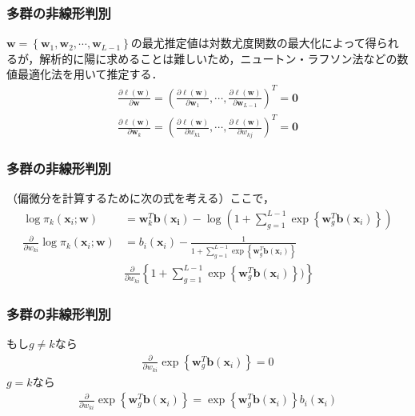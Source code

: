 \documentclass[dvipdfmx,cjk]{beamer}
\theoremstyle{example}
\begin{document}
\begin{frame}
    \frametitle{多群の非線形判別}
    $\boldsymbol{w}=\left\{\boldsymbol{w}_1,\boldsymbol{w}_2,\cdots ,\boldsymbol{w}_{L-1}\right\}$の最尤推定値は対数尤度関数の最大化によって得られるが，解析的に陽に求めることは難しいため，ニュートン・ラフソン法などの数値最適化法を用いて推定する．
    \begin{align*}
        \frac{\partial \ell(\boldsymbol{w})}{\partial \boldsymbol{w}}=(\frac{\partial \ell(\boldsymbol{w})}{\partial \boldsymbol{w}_1},\cdots , \frac{\partial \ell(\boldsymbol{w})}{\partial \boldsymbol{w}_{L-1}})^T=\boldsymbol{0} \\
        \frac{\partial \ell(\boldsymbol{w})}{\partial \boldsymbol{w}_k}=(\frac{\partial \ell(\boldsymbol{w})}{\partial w_{k1}},\cdots ,\frac{\partial \ell(\boldsymbol{w})}{\partial w_{kj}})^T=\boldsymbol{0}
    \end{align*}
\end{frame}

\begin{frame}
    \frametitle{多群の非線形判別}
    （偏微分を計算するために次の式を考える）ここで，
    \begin{align*}
        \log \pi_k(\boldsymbol{x}_i;\boldsymbol{w})                                  & =\boldsymbol{w}_k^T\boldsymbol{b}(\boldsymbol{x_i})-\log(1+\sum\limits_{g=1}^{L-1}\exp\left\{\boldsymbol{w}_g^T\boldsymbol{b}(\boldsymbol{x}_i)\right\}) \\
        \frac{\partial}{\partial w_{ki}} \log \pi_k(\boldsymbol{x}_i;\boldsymbol{w}) & =b_i(\boldsymbol{x}_i)-\frac{1}{1+\sum\limits_{g=1}^{L-1}\exp\left\{\boldsymbol{w}_g^T\boldsymbol{b}(\boldsymbol{x}_i)\right\}}                          \\
                                                                                     & \frac{\partial}{\partial w_{ki}}\left\{1+\sum\limits_{g=1}^{L-1}\exp\left\{\boldsymbol{w}_g^T\boldsymbol{b}(\boldsymbol{x}_i)\right\})\right\}\tag{B}
    \end{align*}
\end{frame}

\begin{frame}
    \frametitle{多群の非線形判別}
    もし$g\neq k$なら
    \begin{align*}
        \frac{\partial}{\partial w_{ki}}\exp\left\{\boldsymbol{w}_g^T\boldsymbol{b}(\boldsymbol{x}_i)\right\}=0
    \end{align*}
    $g=k$なら
    \begin{align*}
        \frac{\partial}{\partial w_{ki}}\exp\left\{\boldsymbol{w}_g^T\boldsymbol{b}(\boldsymbol{x}_i)\right\}=\exp \left\{\boldsymbol{w}_g^T\boldsymbol{b}(\boldsymbol{x}_i)\right\}b_i(\boldsymbol{x}_i)
    \end{align*}
\end{frame}
\end{document}
